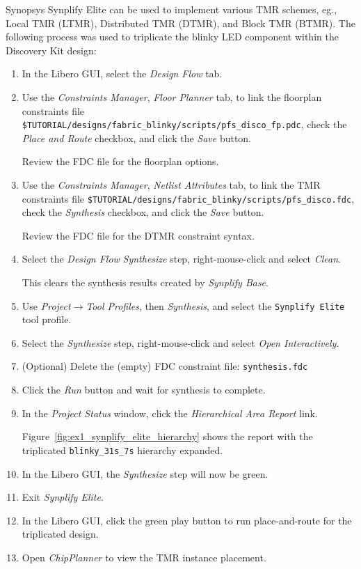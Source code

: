 Synopsys Synplify Elite can be used to implement various TMR schemes,
eg., Local TMR (LTMR), Distributed TMR (DTMR), and Block TMR (BTMR).
%
The following process was used to triplicate the blinky LED component
within the Discovery Kit design:
%
\begin{enumerate}
\item In the Libero GUI, select the \emph{Design Flow} tab.
\item Use the \emph{Constraints Manager}, \emph{Floor Planner} tab, to
link the floorplan constraints file\newline
\verb+$TUTORIAL/designs/fabric_blinky/scripts/pfs_disco_fp.pdc+,\newline %
check the \emph{Place and Route} checkbox,
and click the \emph{Save} button.

Review the FDC file for the floorplan options.
\item Use the \emph{Constraints Manager}, \emph{Netlist Attributes} tab, to
link the TMR constraints file\newline
\verb+$TUTORIAL/designs/fabric_blinky/scripts/pfs_disco.fdc+,\newline %
check the \emph{Synthesis} checkbox,
and click the \emph{Save} button.

Review the FDC file for the DTMR constraint syntax.
\item Select the \emph{Design Flow} \emph{Synthesize} step, right-mouse-click and select
\emph{Clean}.

This clears the synthesis results created by \emph{Synplify Base}.

\item Use \emph{Project$\rightarrow$Tool Profiles},
then \emph{Synthesis}, and select the \verb+Synplify Elite+ tool profile.
\item Select the \emph{Synthesize} step, right-mouse-click and select
\emph{Open Interactively}.

\item (Optional) Delete the (empty) FDC constraint file:
\verb+synthesis.fdc+%
\item Click the \emph{Run} button and wait for synthesis to complete.
\item In the \emph{Project Status} window, click the \emph{Hierarchical Area Report} link.

Figure~\ref{fig:ex1_synplify_elite_hierarchy} shows the report with the
triplicated \verb+blinky_31s_7s+ hierarchy expanded.

\item In the Libero GUI, the \emph{Synthesize} step will now be green.

\item Exit \emph{Synplify Elite}.

\item In the Libero GUI, click the green play button to run place-and-route
for the triplicated design.

\item Open \emph{ChipPlanner} to view the TMR instance placement.
\end{enumerate}

